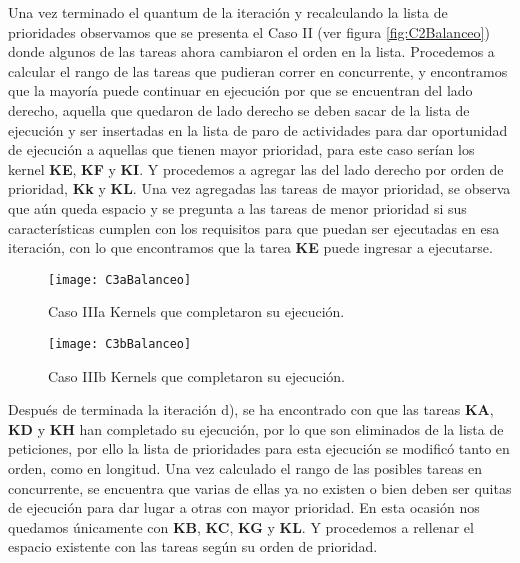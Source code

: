     Una vez terminado el quantum de la iteración y recalculando la lista de prioridades observamos que se presenta el Caso II (ver figura \ref{fig:C2Balanceo}) donde algunos de las tareas ahora cambiaron el orden en la lista. Procedemos a calcular el rango de las tareas que pudieran correr en concurrente, y encontramos que la mayoría puede continuar en ejecución por que se encuentran del lado derecho, aquella que quedaron de lado derecho se deben sacar de la lista de ejecución y ser insertadas en la lista de paro de actividades para dar oportunidad de ejecución a aquellas que tienen mayor prioridad, para este caso serían los kernel \textbf{KE}, \textbf{KF} y \textbf{KI}. Y procedemos a agregar las del lado derecho por orden de prioridad, \textbf{Kk} y \textbf{KL}. Una vez agregadas las tareas de mayor prioridad, se observa que aún queda espacio y se pregunta a las tareas de menor prioridad si sus características cumplen con los requisitos para que puedan ser ejecutadas en esa iteración, con lo que encontramos que la tarea \textbf{KE} puede ingresar a ejecutarse.     
    \newline
    
    \begin{figure}[]
      \centering
        \texttt{[image: C3aBalanceo]}
        \caption{Caso IIIa Kernels que completaron su ejecución.}
        \label{fig:C3aBalanceo}
    \end{figure}
    
    \begin{figure}[]
      \centering
        \texttt{[image: C3bBalanceo]}
        \caption{Caso IIIb Kernels que completaron su ejecución.}
        \label{fig:C3bBalanceo}
    \end{figure}
    
    Después de terminada la iteración d), se ha encontrado con que las tareas \textbf{KA}, \textbf{KD} y \textbf{KH} han completado su ejecución, por lo que son eliminados de la lista de peticiones, por ello la lista de prioridades para esta ejecución se modificó tanto en orden, como en longitud. Una vez calculado el rango de las posibles tareas en concurrente, se encuentra que varias de ellas ya no existen o bien deben ser quitas de ejecución para dar lugar a otras con mayor prioridad. En esta ocasión nos quedamos únicamente con \textbf{KB}, \textbf{KC}, \textbf{KG} y \textbf{KL}. Y procedemos a rellenar el espacio existente con las tareas según su orden de prioridad. 
    \newline
    
